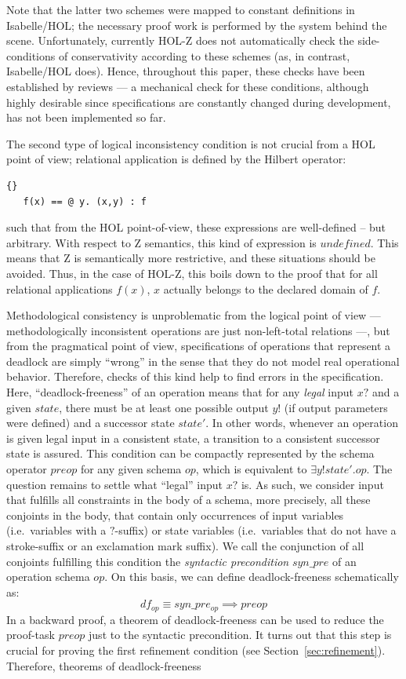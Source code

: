 Note that the latter two schemes were mapped to constant definitions in
Isabelle/HOL; the necessary proof work is performed by the system behind the scene.
Unfortunately, currently HOL-Z does not automatically check the side-conditions
of conservativity according to these schemes (as, in contrast, Isabelle/HOL
does).  Hence, throughout this paper, these checks have been established by
reviews --- a mechanical check for these conditions, although highly desirable 
since specifications are constantly changed during development,
has not been implemented so far. 

The second type of logical inconsistency condition is not crucial from a HOL
point of view; relational application is defined by the Hilbert operator:
\begin{lstlisting}{}
   f(x) == @ y. (x,y) : f
\end{lstlisting}
such that from the HOL point-of-view, these expressions are well-defined -- but
arbitrary. With respect to Z semantics, this kind of expression is $undefined$.
This means that Z is semantically more restrictive, and these situations should
be avoided.  Thus, in the case of HOL-Z, this boils down to the proof that for
all relational applications $f(x)$, $x$ actually belongs to the declared domain
of $f$.

Methodological consistency is unproblematic from the logical point of view ---
methodologically inconsistent operations are just non-left-total relations ---,
but from the pragmatical point of view, specifications of operations that
represent a deadlock are simply ``wrong'' in the sense that they do not model
real operational behavior. Therefore, checks of this kind help to find errors
in the specification. Here, ``deadlock-freeness'' of an operation means that for
any \emph{legal} input $x?$ and a given $state$, there must be at least one
possible output $y!$ (if output parameters were defined) and a successor state
$state'$. In other words, whenever an operation is given legal input in a
consistent state, a transition to a consistent successor state is assured. This
condition can be compactly represented by the schema operator $pre op$ for any
given schema $op$, which is equivalent to $\exists y! state'. op$.  The question
remains to settle what ``legal'' input $x?$ is. As such, we consider input that
fulfills all constraints in the body of a schema, more precisely, all these
conjoints in the body, that contain only occurrences of input variables (i.e.\
variables with a $?$-suffix) or state variables (i.e.\  variables that do not
have a stroke-suffix or an exclamation mark suffix). We call the conjunction of
all conjoints fulfilling this condition the \emph{syntactic precondition}
$syn\_pre$ of an operation schema $op$. On this basis, we can define
deadlock-freeness schematically as:
\[
   df_{op} \equiv syn\_pre_{op} \implies pre op
\]
In a backward proof, a theorem of deadlock-freeness can be used to reduce the
proof-task $pre op$ just to the syntactic precondition. It turns out that this
step is crucial for proving the first refinement condition (see
Section~\ref{sec:refinement}). Therefore, theorems of deadlock-freeness 

